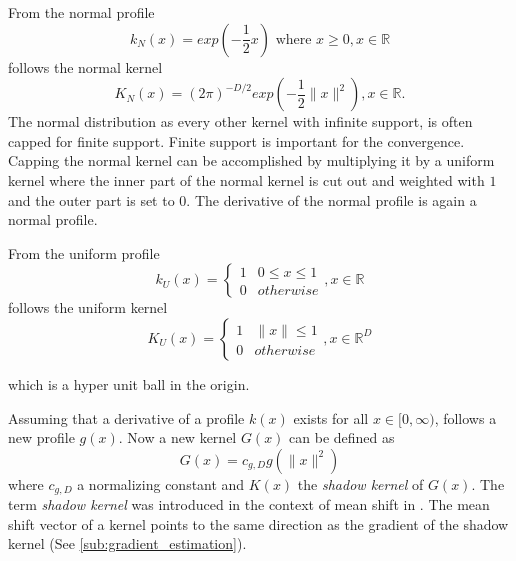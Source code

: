 From the normal profile
\begin{equation}\label{eq:nml}
  k_N(x) = exp \left( - \frac{1}{2} x \right) \textrm{ where } x \geq 0, x \in \mathbb{R}
\end{equation}
follows the normal kernel
\begin{equation}\label{eq:nmlk}
  K_N(x) = (2\pi)^{-D/2}exp\left( -\frac{1}{2} \lVert x \rVert^2 \right), x \in \mathbb{R}.
\end{equation}
The normal distribution as every other kernel with infinite support,
is often capped for finite support. Finite support is important for
the convergence. Capping the normal kernel can be accomplished by
multiplying it by a uniform kernel where the inner part of the normal
kernel is cut out and weighted with $1$ and the outer part is set to
$0$. The derivative of the normal profile is again a normal profile.

From the uniform profile
\begin{equation}\label{eq:unf}
  k_U(x) = \begin{cases}
    1 &  0 \leq x \leq 1\\
    0 & \mathit{otherwise}
  \end{cases}, x \in \mathbb{R}
\end{equation}
follows the uniform kernel
\begin{equation}\label{eq:unfk}
  K_U(x) = \begin{cases}
    1 &  \lVert x \rVert  \leq 1\\
    0 & \mathit{otherwise}
  \end{cases}, x \in \mathbb{R}^D
\end{equation}

which is a hyper unit ball in the origin.

Assuming that a derivative of a profile $k(x)$ exists for all $x \in
[0, \infty)$, follows a new profile $g(x)$. Now a new kernel $G(x)$
can be defined as
\begin{equation}\label{eq:shadowk}
  G(x) = c_{g,D}g(\lVert x \rVert^2)
\end{equation}
where $c_{g,D}$ a normalizing constant and $K(x)$ the \emph{shadow
  kernel} of $G(x)$. The term \emph{shadow kernel} was introduced in
the context of mean shift in \citep{citeulike:2522867}. The mean shift
vector of a kernel points to the same direction as the gradient of the
shadow kernel (See \autoref{sub:gradient_estimation}).



